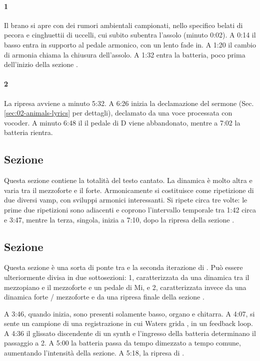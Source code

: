 \documentclass[class=book, crop=false, oneside, 12pt]{standalone}
\begin{document}
    \paragraph{1} 
    Il brano si apre con dei rumori ambientali campionati, nello specifico belati di pecora e cinghuettii di uccelli, cui subito  subentra l'assolo (minuto 0:02). A 0:14 il basso entra in supporto al pedale armonico, con un lento fade in. A 1:20 il cambio di armonia chiama la chiusura dell'assolo. A 1:32 entra la batteria, poco prima dell'inizio della sezione .

    \paragraph{2} 
    La ripresa avviene a minuto 5:32. A 6:26 inizia la declamazione del sermone (Sec.\ref{sec:02-animals-lyrics} per dettagli), declamato da una voce processata con vocoder. A minuto 6:48 il il pedale di D viene abbandonato, mentre a 7:02 la batteria rientra.

    \subsection{Sezione }
    Questa sezione contiene la totalità del testo cantato. La dinamica è molto altra e varia tra il mezzoforte e il forte. Armonicamente si costituisce come ripetizione di due diversi vamp, con sviluppi armonici interessanti. Si ripete circa tre volte: le prime due ripetizioni sono adiacenti e coprono l'intervallo temporale tra 1:42 circa e 3:47, mentre la terza, singola,  inizia a 7:10, dopo la ripresa della sezione .

    \subsection{Sezione }
    Questa sezione è una sorta di ponte tra  e la seconda iterazione di . Può essere ulteriormente divisa in due sottosezioni: 1, caratterizzata da una dinamica tra il mezzopiano e il mezzoforte e un pedale di Mi, e 2, caratterizzata invece da una dinamica forte / mezzoforte e da una ripresa finale della sezione .

    A 3:46, quando inizia, sono presenti solamente basso, organo e chitarra. A 4:07, si sente un campione  di una registrazione in cui Waters grida , in un feedback loop. A 4:36 il glissato discendente di un synth e l'ingresso della batteria determinano il passaggio a 2. A 5:00 la batteria passa da tempo dimezzato a tempo comune, aumentando l'intensità della sezione. A 5:18, la ripresa di .
\end{document}

